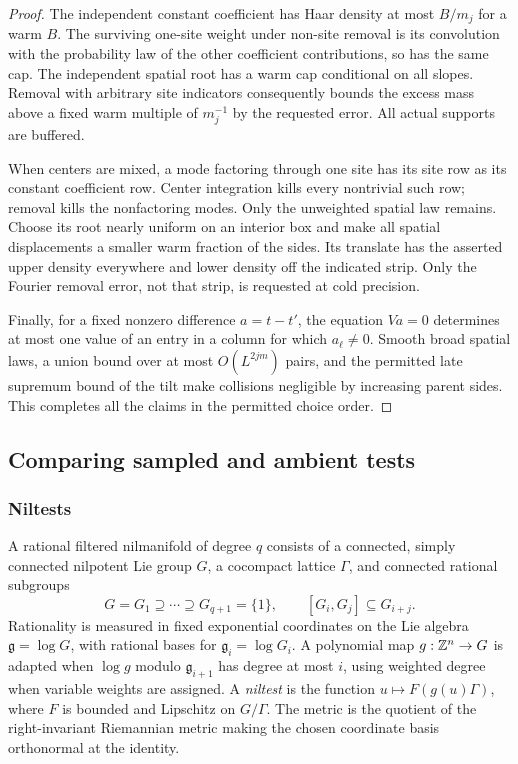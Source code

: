 \begin{proof}
The independent constant coefficient has Haar density at most
$B/m_j$ for a warm $B$.  The surviving one-site weight under
non-site removal is its convolution with the probability law of
the other coefficient contributions, so has the same cap.  The
independent spatial root has a warm cap conditional on all slopes.
Removal with arbitrary site indicators consequently bounds the
excess mass above a fixed warm multiple of $m_j^{-1}$ by the
requested error.  All actual supports are buffered.

When centers are mixed, a mode factoring through one site has its
site row as its constant coefficient row.  Center integration kills
every nontrivial such row; removal kills the nonfactoring modes.
Only the unweighted spatial law remains.  Choose its root nearly
uniform on an interior box and make all spatial displacements a
smaller warm fraction of the sides.  Its translate has the asserted
upper density everywhere and lower density off the indicated strip.
Only the Fourier removal error, not that strip, is requested at
cold precision.

Finally, for a fixed nonzero difference $a=t-t'$, the equation
$Va=0$ determines at most one value of an entry in a column for
which $a_\ell\ne0$.  Smooth broad spatial laws, a union bound over
at most $O(L^{2jm})$ pairs, and the permitted late supremum bound
of the tilt make collisions negligible by increasing parent sides.
This completes all the claims in the permitted choice order.
\end{proof}

\subsection{Comparing sampled and ambient tests}

\subsubsection{Niltests}\label{ap:niltest-conventions}
A rational filtered nilmanifold of degree $q$ consists of a connected,
simply connected nilpotent Lie group $G$, a cocompact lattice $\Gamma$,
and connected rational subgroups
\[
 G=G_1\supseteq\cdots\supseteq G_{q+1}=\{1\},
 \qquad [G_i,G_j]\subseteq G_{i+j}.
\]
Rationality is measured in fixed exponential coordinates on the Lie
algebra $\mathfrak g=\log G$, with rational bases for
$\mathfrak g_i=\log G_i$. A polynomial map $g:\mathbb Z^n\to G$ is
adapted when $\log g$ modulo $\mathfrak g_{i+1}$ has degree at
most $i$, using weighted degree when variable weights are assigned.
A \emph{niltest} is the function $u\mapsto F(g(u)\Gamma)$,
where $F$ is bounded and Lipschitz on $G/\Gamma$. The metric is
the quotient of the right-invariant Riemannian metric making the
chosen coordinate basis orthonormal at the identity.

